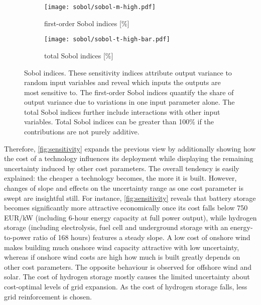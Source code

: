 \begin{figure}
    \begin{subfigure}[t]{0.45\textwidth}
        \caption{first-order Sobol indices [\%]}
        \label{fig:sobol:first}
        \texttt{[image: sobol/sobol-m-high.pdf]}
    \end{subfigure}
    \begin{subfigure}[t]{0.54\textwidth}
        \caption{total Sobol indices [\%]}
        \label{fig:sobol:total}
        \texttt{[image: sobol/sobol-t-high-bar.pdf]}
    \end{subfigure}
    \vspace{-0.3cm}
    \caption[First-order and total Sobol indices]{
      Sobol indices. These sensitivity indices attribute output variance to random input variables
      and reveal which inputs the outputs are most sensitive to. The first-order Sobol indices
      quantify the share of output variance due to variations in one input parameter alone.
      The total Sobol indices further include interactions with other input variables.
      Total Sobol indices can be greater than 100\% if the contributions are not purely additive.
    }
    \label{fig:sobol}
\end{figure}


Therefore, \cref{fig:sensitivity} expands the previous view by additionally
showing how the cost of a technology influences its deployment while displaying
the remaining uncertainty induced by other cost parameters. The overall tendency
is easily explained: the cheaper a technology becomes, the more it is built.
However, changes of slope and effects on the uncertainty range as one cost
parameter is swept are insightful still. For instance, \cref{fig:sensitivity}
reveals that battery storage becomes significantly more attractive economically
once its cost falls below 750 EUR/kW (including 6-hour energy capacity at full
power output), while hydrogen storage (including electrolysis, fuel cell and
underground storage with an energy-to-power ratio of 168 hours) features a
steady slope. A low cost of onshore wind makes building much onshore wind
capacity attractive with low uncertainty, whereas if onshore wind costs are high
how much is built greatly depends on other cost parameters. The opposite
behaviour is observed for offshore wind and solar. The cost of hydrogen storage
mostly causes the limited uncertainty about cost-optimal levels of grid
expansion. As the cost of hydrogen storage falls, less grid reinforcement is
chosen.

